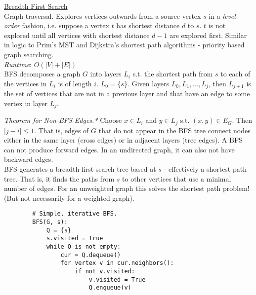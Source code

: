 \documentclass[12pt, fleqn]{general}
\begin{document}
\begin{multicols*}{2}
    {\large \underline{Breadth First Search}}\\

    Graph traversal. Explores vertices outwards from a source vertex $s$ in a \emph{level-order} fashion, i.e. suppose a vertex $t$ has shortest distance $d$ to $s$. $t$ is not explored until all vertices with shortest distance $d-1$ are explored first. Similar in logic to Prim's MST and Dijkstra's shortest path algorithms - priority based graph searching.\\

    \emph{Runtime}: $O(|V| + |E|)$\\

    BFS decomposes a graph $G$ into layers $L_i$ s.t. the shortest path from $s$ to each of the vertices in $L_i$ is of length $i$. $L_0 = \{s\}$. Given layers $L_0, L_1, \dots, L_j$, then $L_{j+1}$ is the set of vertices that are not in a previous layer and that have an edge to some vertex in layer $L_j$.

    \emph{Theorem for Non-BFS Edges.*} Choose $x \in L_i$ and $y \in L_j$ s.t. $(x, y) \in E_G$. Then $|j-i| \leq 1$. That is, edges of $G$ that do not appear in the BFS tree connect nodes either in the same layer (cross edges) or in adjacent layers (tree edges). A BFS can not produce forward edges. In an undirected graph, it can also not have backward edges. \\

    BFS generates a breadth-first search tree based at $s$ - effectively a shortest path tree. That is, it finds the paths from $s$ to other vertices that use a minimal number of edges. For an unweighted graph this solves the shortest path problem! (But not necessarily for a weighted graph).\\

    \begin{framed}
    \begingroup
    \makeatletter
    \@totalleftmargin=-1.5cm
    \begin{verbatim}
        # Simple, iterative BFS.
        BFS(G, s):
            Q = {s}
            s.visited = True
            while Q is not empty:
                cur = Q.dequeue()
                for vertex v in cur.neighbors():
                    if not v.visited:
                        v.visited = True
                        Q.enqueue(v)
    \end{verbatim}
    \makeatother
    \endgroup
    \end{framed}


\end{multicols*}
\end{document}

